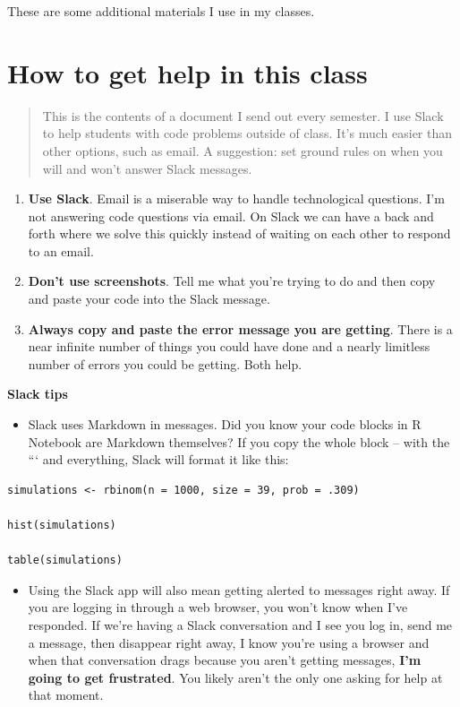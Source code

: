 \documentclass[]{book}
\providecommand{\tightlist}{%
  \setlength{\itemsep}{0pt}\setlength{\parskip}{0pt}}
\begin{document}
These are some additional materials I use in my classes.

\hypertarget{how-to-get-help-in-this-class}{%
\section{How to get help in this class}\label{how-to-get-help-in-this-class}}

\begin{quote}
This is the contents of a document I send out every semester. I use Slack to help students with code problems outside of class. It's much easier than other options, such as email. A suggestion: set ground rules on when you will and won't answer Slack messages.
\end{quote}

\begin{enumerate}
\def\labelenumi{\arabic{enumi}.}
\tightlist
\item
  \textbf{Use Slack}. Email is a miserable way to handle technological questions. I'm not answering code questions via email. On Slack we can have a back and forth where we solve this quickly instead of waiting on each other to respond to an email.
\item
  \textbf{Don't use screenshots}. Tell me what you're trying to do and then copy and paste your code into the Slack message.
\item
  \textbf{Always copy and paste the error message you are getting}. There is a near infinite number of things you could have done and a nearly limitless number of errors you could be getting. Both help.
\end{enumerate}

\textbf{Slack tips}

\begin{itemize}
\tightlist
\item
  Slack uses Markdown in messages. Did you know your code blocks in R Notebook are Markdown themselves? If you copy the whole block -- with the ``` and everything, Slack will format it like this:
\end{itemize}

\begin{verbatim}
simulations <- rbinom(n = 1000, size = 39, prob = .309)

hist(simulations)

table(simulations)
\end{verbatim}

\begin{itemize}
\tightlist
\item
  Using the Slack app will also mean getting alerted to messages right away. If you are logging in through a web browser, you won't know when I've responded. If we're having a Slack conversation and I see you log in, send me a message, then disappear right away, I know you're using a browser and when that conversation drags because you aren't getting messages, \textbf{I'm going to get frustrated}. You likely aren't the only one asking for help at that moment.
\end{itemize}


\end{document}
